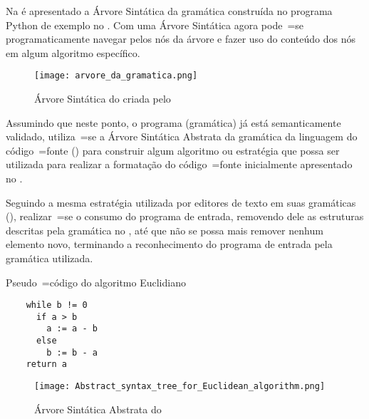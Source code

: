 Na  é apresentado a Árvore Sintática da gramática construída no programa Python de exemplo no .
Com uma Árvore Sintática agora pode~=se programaticamente navegar pelos nós da árvore e
fazer uso do conteúdo dos nós em algum algoritmo específico.
\begin{figure}[H]
\caption{Árvore Sintática do  criada pelo }
\label{figure:arvoreSintaticaDaGramaticaDaMetagramatica}
\centering
\texttt{[image: arvore\_da\_gramatica.png]}
\end{figure}

Assumindo que neste ponto,
o programa (gramática) já está semanticamente validado,
utiliza~=se a Árvore Sintática Abstrata da gramática da linguagem do código~=fonte () para construir algum algoritmo ou
estratégia que possa ser utilizada para realizar a formatação do código~=fonte inicialmente apresentado no .

Seguindo a mesma estratégia utilizada por editores de texto em suas gramáticas (),
realizar~=se o consumo do programa de entrada,
removendo dele as estruturas descritas pela gramática no ,
até que não se possa mais remover nenhum elemento novo,
terminando a reconhecimento do programa de entrada pela gramática utilizada.
\ifadvisor
\else
    \begin{code}
    \caption{Pseudo~=código do algoritmo Euclidiano \cite{analysisOfTheBinaryEuclideanAlgorithm}}
    \label{code:Abstract_syntax_tree_for_Euclidean_algorithm}
    \begin{verbatim}
    while b != 0
      if a > b
        a := a - b
      else
        b := b - a
    return a
    \end{verbatim}
    \end{code}

    \begin{figure}[!htb]
    \caption{Árvore Sintática Abstrata do }
    \label{figure:Abstract_syntax_tree_for_Euclidean_algorithm}
    \centering
    \texttt{[image: Abstract\_syntax\_tree\_for\_Euclidean\_algorithm.png]}
    \end{figure}
\fi

